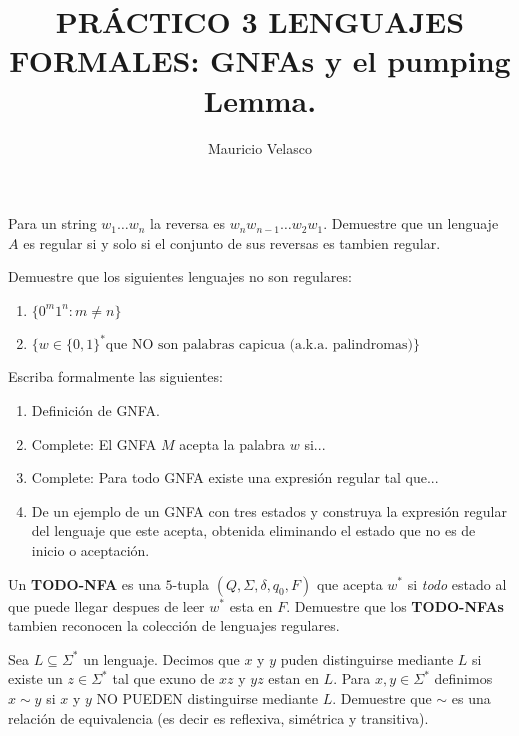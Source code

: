 \documentclass[12pt, a4paper]{article}
\date{}
\begin{document}
\title{PRÁCTICO 3 LENGUAJES FORMALES: GNFAs y el pumping Lemma.}
\author{Mauricio Velasco}
\maketitle{}


\item Para un string $w_1\dots w_n$ la reversa es $w_nw_{n-1}\dots w_2w_1$. Demuestre que un lenguaje $A$ es regular si y solo si el conjunto de sus reversas es tambien regular.

\item Demuestre que los siguientes lenguajes no son regulares:
\begin{enumerate}
\item $\{0^m1^n: m\neq n\}$
\item $\{w\in \{0,1\}^* \text{que NO son palabras capicua (a.k.a. palindromas)}\}$
\end{enumerate}

\item Escriba formalmente las siguientes:
\begin{enumerate}
\item Definición de GNFA.
\item Complete: El GNFA $M$ acepta la palabra $w$ si...
\item Complete: Para todo GNFA existe una expresión regular tal que...
\item De un ejemplo de un GNFA con tres estados y construya la expresión regular del lenguaje que este acepta, obtenida eliminando el estado que no es de inicio o aceptación.
\end{enumerate}

\item Un {\bf TODO-NFA} es una $5$-tupla $(Q,\Sigma,\delta,q_0,F)$ que acepta $w^*$ si \emph{todo} estado al que puede llegar despues de leer $w^*$ esta en $F$. Demuestre que los {\bf TODO-NFAs} tambien reconocen la colección de lenguajes regulares.

\item Sea $L\subseteq \Sigma^*$ un lenguaje. Decimos que $x$ y $y$ puden distinguirse mediante $L$ si existe un $z\in \Sigma^*$ tal que ex uno de $xz$ y $yz$ estan en $L$. Para $x,y\in \Sigma^*$ definimos $x\sim y$ si $x$ y $y$ NO PUEDEN distinguirse mediante $L$. Demuestre que $\sim$ es una relación de equivalencia (es decir es reflexiva, simétrica y transitiva).
\end{document}
